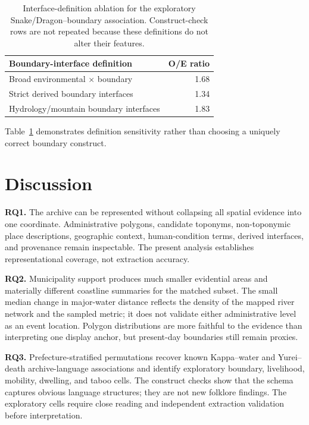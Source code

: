 \documentclass[9pt,twocolumn,a4paper]{extarticle}
\begin{document}


\begin{table}[t]
\centering
\small
\begin{tabular}{lr}
\toprule
Boundary-interface definition & O/E ratio \\
\midrule
Broad environmental \(\times\) boundary & 1.68 \\
Strict derived boundary interfaces & 1.34 \\
Hydrology/mountain boundary interfaces & 1.83 \\
\bottomrule
\end{tabular}
\caption{Interface-definition ablation for the exploratory Snake/Dragon--boundary association. Construct-check rows are not repeated because these definitions do not alter their features.}
\label{tab:interface-ablation}
\end{table}

Table~\ref{tab:interface-ablation} demonstrates definition sensitivity rather than choosing a uniquely correct boundary construct.

\section{Discussion}

\textbf{RQ1.} The archive can be represented without collapsing all spatial evidence into one coordinate. Administrative polygons, candidate toponyms, non-toponymic place descriptions, geographic context, human-condition terms, derived interfaces, and provenance remain inspectable. The present analysis establishes representational coverage, not extraction accuracy.

\textbf{RQ2.} Municipality support produces much smaller evidential areas and materially different coastline summaries for the matched subset. The small median change in major-water distance reflects the density of the mapped river network and the sampled metric; it does not validate either administrative level as an event location. Polygon distributions are more faithful to the evidence than interpreting one display anchor, but present-day boundaries still remain proxies.

\textbf{RQ3.} Prefecture-stratified permutations recover known Kappa--water and Yurei--death archive-language associations and identify exploratory boundary, livelihood, mobility, dwelling, and taboo cells. The construct checks show that the schema captures obvious language structures; they are not new folklore findings. The exploratory cells require close reading and independent extraction validation before interpretation.
\end{document}
